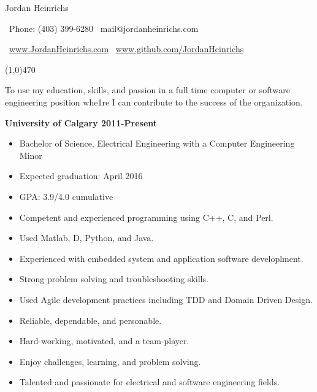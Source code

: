 \documentclass[12pt]{article}
\begin{document}

\centerline{{\Huge \sc Jordan Heinrichs}}
\centerline{\textbullet\ Phone: (403) 399-6280 \hspace{5pt} \textbullet\ mail@jordanheinrichs.com}
\centerline{\textbullet\ \url{www.JordanHeinrichs.com}  \hspace{5pt} \textbullet\ \url{www.github.com/JordanHeinrichs}}
\noindent
\line(1,0){470}\\

\medskip
{}
\medskip

\noindent To use my education, skills, and passion in a full time computer or software engineering position whe1re I can contribute to the success of the organization.

\bigskip
{}
\medskip

\noindent \centerline{ \bf University of Calgary \hfill 2011-Present}
\begin{itemize}[parsep=0pt,partopsep=0pt]
  \item Bachelor of Science, Electrical Engineering with a Computer Engineering Minor
  \item Expected graduation: April 2016
  \item GPA: 3.9/4.0 cumulative
\end{itemize}

\bigskip
{}
\medskip
\begin{itemize}
\item Competent and experienced programming using C++, C, and Perl.
\item Used Matlab, D, Python, and Java.
\item Experienced with embedded system and application software developlment.
\item Strong problem solving and troubleshooting skills.
\item Used Agile development practices including TDD and Domain Driven Design.
\bigskip
\item Reliable, dependable, and personable.
\item Hard-working, motivated, and a team-player.
\item Enjoy challenges, learning, and problem solving.
\item Talented and passionate for electrical and software engineering fields.
\end{itemize}
\noindent

\bigskip
{}
\medskip
\end{document}
